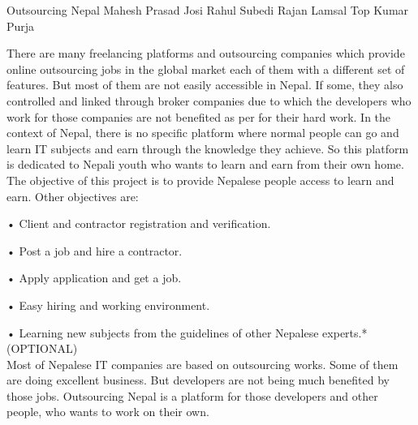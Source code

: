  \begin{conf-abstract}[]
 {Outsourcing Nepal}
 { Mahesh Prasad Josi
 	Rahul Subedi
 	Rajan Lamsal
 	Top Kumar Purja
 }
{}

There are many freelancing platforms and outsourcing companies which provide online outsourcing jobs in the global market each of them with a different set of features. But most of them are not easily accessible in Nepal. If some, they also controlled and linked through broker companies due to which the developers who work for those companies are not benefited as per for their hard work.
In the context of Nepal, there is no specific platform where normal people can go and learn IT subjects and earn through the knowledge they achieve. So this platform is dedicated to Nepali youth who wants to learn and earn from their own home.
\\
The objective of this project is to provide Nepalese people access to learn and earn. Other objectives are:

•    Client and contractor registration and verification.
 
•    Post a job and hire a contractor.

•    Apply application and get a job.

•    Easy hiring and working environment.

•    Learning new subjects from the guidelines of other Nepalese experts.*(OPTIONAL)
\\
   Most of Nepalese IT companies are based on outsourcing works. Some of them are doing excellent business. But developers are not being much benefited by those jobs. 
Outsourcing Nepal is a platform for those developers and other people, who wants to work on their own. 

\end{conf-abstract}

